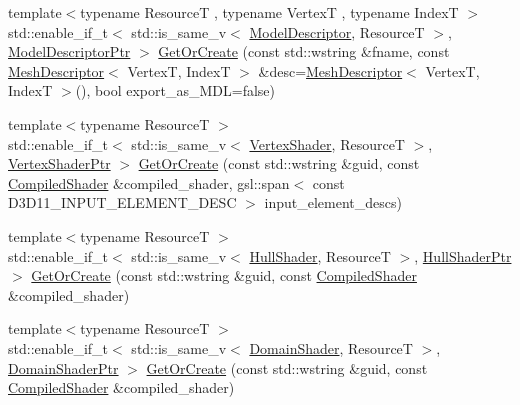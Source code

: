 \begin{DoxyCompactItemize}
\item 
{\footnotesize template$<$typename ResourceT , typename VertexT , typename IndexT $>$ }\\std\+::enable\+\_\+if\+\_\+t$<$ std\+::is\+\_\+same\+\_\+v$<$ \mbox{\hyperlink{classmage_1_1rendering_1_1_model_descriptor}{Model\+Descriptor}}, ResourceT $>$, \mbox{\hyperlink{namespacemage_1_1rendering_a07260934fd7cb48a210873ae73e62911}{Model\+Descriptor\+Ptr}} $>$ \mbox{\hyperlink{classmage_1_1rendering_1_1_resource_manager_ab6e8faf128366c915f5518607653133f}{Get\+Or\+Create}} (const std\+::wstring \&fname, const \mbox{\hyperlink{classmage_1_1rendering_1_1_mesh_descriptor}{Mesh\+Descriptor}}$<$ VertexT, IndexT $>$ \&desc=\mbox{\hyperlink{classmage_1_1rendering_1_1_mesh_descriptor}{Mesh\+Descriptor}}$<$ VertexT, IndexT $>$(), bool export\+\_\+as\+\_\+\+M\+DL=false)
\item 
{\footnotesize template$<$typename ResourceT $>$ }\\std\+::enable\+\_\+if\+\_\+t$<$ std\+::is\+\_\+same\+\_\+v$<$ \mbox{\hyperlink{classmage_1_1rendering_1_1_vertex_shader}{Vertex\+Shader}}, ResourceT $>$, \mbox{\hyperlink{namespacemage_1_1rendering_aaf704b9c54a4181f4950a1761de69dda}{Vertex\+Shader\+Ptr}} $>$ \mbox{\hyperlink{classmage_1_1rendering_1_1_resource_manager_ac61fb76694e31fd1423cf87a934366b3}{Get\+Or\+Create}} (const std\+::wstring \&guid, const \mbox{\hyperlink{classmage_1_1rendering_1_1_compiled_shader}{Compiled\+Shader}} \&compiled\+\_\+shader, gsl\+::span$<$ const D3\+D11\+\_\+\+I\+N\+P\+U\+T\+\_\+\+E\+L\+E\+M\+E\+N\+T\+\_\+\+D\+E\+SC $>$ input\+\_\+element\+\_\+descs)
\item 
{\footnotesize template$<$typename ResourceT $>$ }\\std\+::enable\+\_\+if\+\_\+t$<$ std\+::is\+\_\+same\+\_\+v$<$ \mbox{\hyperlink{namespacemage_1_1rendering_aa133f36cd1a81c87eedf962270a12f48}{Hull\+Shader}}, ResourceT $>$, \mbox{\hyperlink{namespacemage_1_1rendering_a6f33b2e1ea7f2ae3824dc7fb6875c655}{Hull\+Shader\+Ptr}} $>$ \mbox{\hyperlink{classmage_1_1rendering_1_1_resource_manager_a69d61631cdcc70c5fd70852abc3c3d1a}{Get\+Or\+Create}} (const std\+::wstring \&guid, const \mbox{\hyperlink{classmage_1_1rendering_1_1_compiled_shader}{Compiled\+Shader}} \&compiled\+\_\+shader)
\item 
{\footnotesize template$<$typename ResourceT $>$ }\\std\+::enable\+\_\+if\+\_\+t$<$ std\+::is\+\_\+same\+\_\+v$<$ \mbox{\hyperlink{namespacemage_1_1rendering_a02bd57ea68f48dd6e0d37a1362ad1ea2}{Domain\+Shader}}, ResourceT $>$, \mbox{\hyperlink{namespacemage_1_1rendering_a85a8911c7c1e9e42bd7c3acbc2725076}{Domain\+Shader\+Ptr}} $>$ \mbox{\hyperlink{classmage_1_1rendering_1_1_resource_manager_af2b666ebe9908dfb8f595c2fc3ec29a6}{Get\+Or\+Create}} (const std\+::wstring \&guid, const \mbox{\hyperlink{classmage_1_1rendering_1_1_compiled_shader}{Compiled\+Shader}} \&compiled\+\_\+shader)

\end{DoxyCompactItemize}
